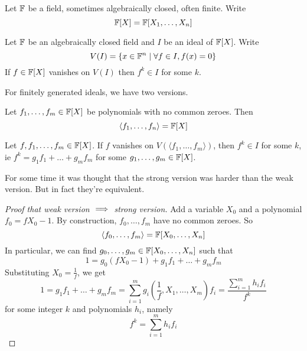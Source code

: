 \documentclass{article}
\begin{document}
Let $\mathbb F$ be a field, sometimes algebraically closed, often finite. Write
$$\mathbb F[X] = \mathbb F[X_1, \dots, X_n]$$

\begin{thm}
  Let $\mathbb F$ be an algebraically closed field and $I$ be an ideal of $\mathbb F[X]$. Write
  $$V(I) = \{x \in \mathbb F^n \mid \forall f \in I, f(x) = 0\}$$
  If $f \in \mathbb F[X]$ vanishes on $V(I)$ then $f^k \in I$ for some $k$.
\end{thm}

For finitely generated ideals, we have two versions.

\begin{thm}
  Let $f_1, \dots, f_m \in \mathbb F[X]$ be polynomials with no common zeroes. Then
  $$\langle f_1, \dots, f_n\rangle = \mathbb F[X]$$
\end{thm}

\begin{thm}
  Let $f, f_1, \dots, f_m \in \mathbb F[X]$. If $f$ vanishes on $V(\langle f_1, \dots, f_m\rangle)$, then $f^k \in I$ for some $k$, ie $f^k = g_1f_1 + \dots + g_mf_m$ for some $g_1, \dots, g_m \in \mathbb F[X]$.
\end{thm}

For some time it was thought that the strong version was harder than the weak version. But in fact they're equivalent.

\begin{proof}[Proof that weak version $\implies$ strong version]
  Add a variable $X_0$ and a polynomial $f_0 = fX_0 - 1$. By construction, $f_0, \dots, f_m$ have no common zeroes. So
  $$\langle f_0, \dots, f_m\rangle = \mathbb F[X_0, \dots, X_n]$$
  In particular, we can find $g_0, \dots, g_m \in \mathbb F[X_0, \dots, X_n]$ such that
  $$1 = g_0(fX_0 - 1) + g_1f_1 + \dots + g_m f_m$$
  Substituting $X_0 = \frac 1f$, we get
  $$1 = g_1f_1 + \dots + g_m f_m = \sum_{i = 1}^m g_i\left(\frac 1f, X_1, \dots, X_m\right)f_i = \frac{\sum_{i = 1}^m h_if_i}{f^k}$$
  for some integer $k$ and polynomials $h_i$, namely
  $$f^k = \sum_{i = 1}^m h_if_i$$
\end{proof}

\newlec
\end{document}
